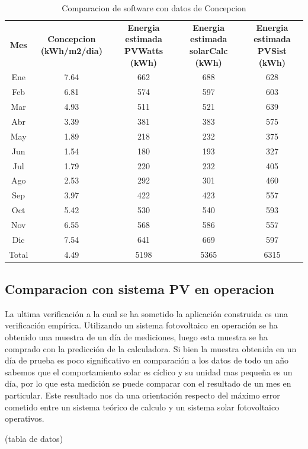 \begin{table}[h!]
\caption{Comparacion de software con datos de Concepcion}
\begin{tabular}{|c|c|c|c|c|}
        \hline
	\textbf{Mes}&\textbf{Concepcion (kWh/m2/dia)}&\textbf{Energia estimada PVWatts (kWh)}&\textbf{Energia estimada solarCalc (kWh)}&\textbf{Energia estimada PVSist (kWh)}\\
	Ene&	7.64&	662&	688&	628\\
        \hline
	Feb&	6.81&	574&	597&	603\\
        \hline
	Mar&	4.93&	511&	521&	639\\
        \hline
	Abr&	3.39&	381&	383&	575\\
        \hline
	May&	1.89&	218&	232&	375\\
        \hline
	Jun&	1.54&	180&	193&	327\\
        \hline
	Jul&	1.79&	220&	232&	405\\
        \hline
	Ago&	2.53&	292&	301&	460\\
        \hline
	Sep&	3.97&	422&	423&	557\\
        \hline
	Oct&	5.42&	530&	540&	593\\
        \hline
	Nov&	6.55&	568&	586&	557\\
        \hline
	Dic&	7.54&	641&	669&	597\\
        \hline
	Total&	4.49&	5198&	5365&	6315\\
        \hline
\end{tabular}
\end{table}

\subsection{Comparacion con sistema PV en operacion}
La ultima verificación a la cual se ha sometido la aplicación construida es una verificación empírica. Utilizando un sistema fotovoltaico en operación se ha obtenido una muestra de un día de mediciones, luego esta muestra se ha comprado con la predicción de la calculadora. Si bien la muestra obtenida en un día de prueba es poco significativo en comparación a los datos de todo un año sabemos que el comportamiento solar es cíclico y su unidad mas pequeña es un día, por lo que esta medición se puede comparar con el resultado de un mes en particular. Este resultado nos da una orientación respecto del máximo error cometido entre un sistema teórico de calculo y un sistema solar fotovoltaico operativos.

(tabla de datos)

